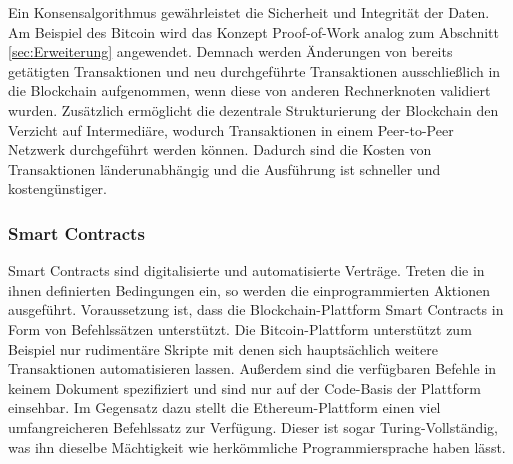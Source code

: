 Ein Konsensalgorithmus gewährleistet die Sicherheit und Integrität der Daten.
Am Beispiel des Bitcoin wird das Konzept \glqq Proof-of-Work\grqq{} analog zum Abschnitt 
\ref{sec:Erweiterung} angewendet. Demnach werden Änderungen von bereits getätigten
Transaktionen und neu durchgeführte Transaktionen ausschließlich in die Blockchain
aufgenommen, wenn diese von anderen Rechnerknoten validiert wurden.
Zusätzlich ermöglicht die dezentrale Strukturierung der Blockchain den Verzicht auf 
Intermediäre, wodurch Transaktionen in einem Peer-to-Peer Netzwerk 
durchgeführt werden können.
\cite[p.~23]{fill2020blockchain}
Dadurch sind die Kosten von Transaktionen länderunabhängig \cite[p.~12]{pirafelnerblockchaintechnologie}
und die Ausführung ist schneller 
und kostengünstiger. \cite[p.~168]{chowdhary2025smart}


\subsubsection{Smart Contracts}
Smart Contracts sind digitalisierte und automatisierte Verträge.
\cite[p.~14]{pirafelnerblockchaintechnologie}
Treten die in ihnen definierten Bedingungen ein, so werden die einprogrammierten Aktionen
ausgeführt.
\cite[p.~55f]{fill2020blockchain}
Voraussetzung ist, dass die Blockchain-Plattform Smart Contracts in Form von 
Befehlssätzen unterstützt. Die Bitcoin-Plattform unterstützt zum Beispiel nur rudimentäre
Skripte mit denen sich hauptsächlich weitere Transaktionen automatisieren lassen. 
Außerdem sind die verfügbaren Befehle in keinem Dokument spezifiziert und sind nur auf
der Code-Basis der Plattform einsehbar.
Im Gegensatz dazu stellt die Ethereum-Plattform einen viel umfangreicheren Befehlssatz
zur Verfügung. Dieser ist sogar Turing-Vollständig, was ihn dieselbe Mächtigkeit wie
herkömmliche Programmiersprache haben lässt. 

